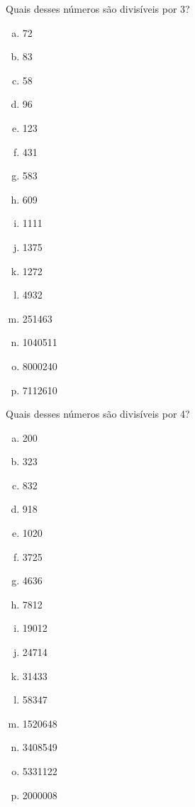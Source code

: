 \item Quais desses números são divisíveis por 3?
\begin{multicols}{4}
\begin{enumerate}[a)]
	\item 72
	\item 83
	\item 58
	\item 96
	\item 123
	\item 431
	\item 583
	\item 609
	\item 1111
	\item 1375
	\item 1272
	\item 4932
	\item 251463
	\item 1040511
	\item 8000240
	\item 7112610
\end{enumerate}
\end{multicols}

\item Quais desses números são divisíveis por 4?
\begin{multicols}{4}
\begin{enumerate}[a)]
	\item 200
	\item 323
	\item 832
	\item 918
	\item 1020
	\item 3725
	\item 4636
	\item 7812
	\item 19012
	\item 24714
	\item 31433
	\item 58347
	\item 1520648
	\item 3408549
	\item 5331122
	\item 2000008
\end{enumerate}
\end{multicols}

